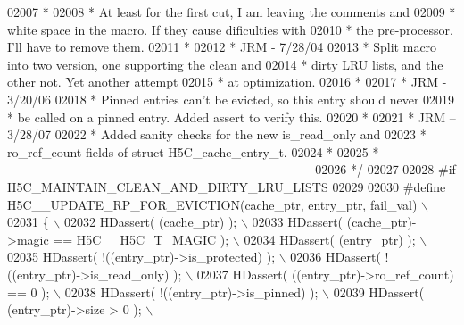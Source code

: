 \begin{DoxyCode}
02007 \textcolor{comment}{ *}
02008 \textcolor{comment}{ *      At least for the first cut, I am leaving the comments and}
02009 \textcolor{comment}{ *      white space in the macro.  If they cause dificulties with}
02010 \textcolor{comment}{ *      the pre-processor, I'll have to remove them.}
02011 \textcolor{comment}{ *}
02012 \textcolor{comment}{ *      JRM - 7/28/04}
02013 \textcolor{comment}{ *      Split macro into two version, one supporting the clean and}
02014 \textcolor{comment}{ *      dirty LRU lists, and the other not.  Yet another attempt}
02015 \textcolor{comment}{ *      at optimization.}
02016 \textcolor{comment}{ *}
02017 \textcolor{comment}{ *      JRM - 3/20/06}
02018 \textcolor{comment}{ *      Pinned entries can't be evicted, so this entry should never}
02019 \textcolor{comment}{ *      be called on a pinned entry.  Added assert to verify this.}
02020 \textcolor{comment}{ *}
02021 \textcolor{comment}{ *      JRM -- 3/28/07}
02022 \textcolor{comment}{ *      Added sanity checks for the new is\_read\_only and}
02023 \textcolor{comment}{ *      ro\_ref\_count fields of struct H5C\_cache\_entry\_t.}
02024 \textcolor{comment}{ *}
02025 \textcolor{comment}{ *-------------------------------------------------------------------------}
02026 \textcolor{comment}{ */}
02027 
02028 \textcolor{preprocessor}{#if H5C\_MAINTAIN\_CLEAN\_AND\_DIRTY\_LRU\_LISTS}
02029 
02030 \textcolor{preprocessor}{#define H5C\_\_UPDATE\_RP\_FOR\_EVICTION(cache\_ptr, entry\_ptr, fail\_val)          \(\backslash\)}
02031 \textcolor{preprocessor}{\{                                                                            \(\backslash\)}
02032 \textcolor{preprocessor}{    HDassert( (cache\_ptr) );                                                 \(\backslash\)}
02033 \textcolor{preprocessor}{    HDassert( (cache\_ptr)->magic == H5C\_\_H5C\_T\_MAGIC );                      \(\backslash\)}
02034 \textcolor{preprocessor}{    HDassert( (entry\_ptr) );                                                 \(\backslash\)}
02035 \textcolor{preprocessor}{    HDassert( !((entry\_ptr)->is\_protected) );                                \(\backslash\)}
02036 \textcolor{preprocessor}{    HDassert( !((entry\_ptr)->is\_read\_only) );                                \(\backslash\)}
02037 \textcolor{preprocessor}{    HDassert( ((entry\_ptr)->ro\_ref\_count) == 0 );                            \(\backslash\)}
02038 \textcolor{preprocessor}{    HDassert( !((entry\_ptr)->is\_pinned) );                                   \(\backslash\)}
02039 \textcolor{preprocessor}{    HDassert( (entry\_ptr)->size > 0 );                                       \(\backslash\)}

\end{DoxyCode}
